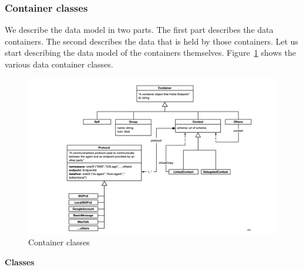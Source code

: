 \documentclass[11pt, oneside]{article}   	%
\begin{document}
\subsubsection{Container classes}

We describe the data model in two parts. The first part describes the data containers. The second describes the data that is held by those containers. Let us start describing the data model of the containers themselves. Figure~\ref{fig:containers} shows the various data container classes. 

\begin{figure}[h!]
\includegraphics[width=\textwidth]{./images/container-classes.png}
\caption{Container classes}
\label{fig:containers}
\end{figure}

\textbf{Classes}
\end{document}
